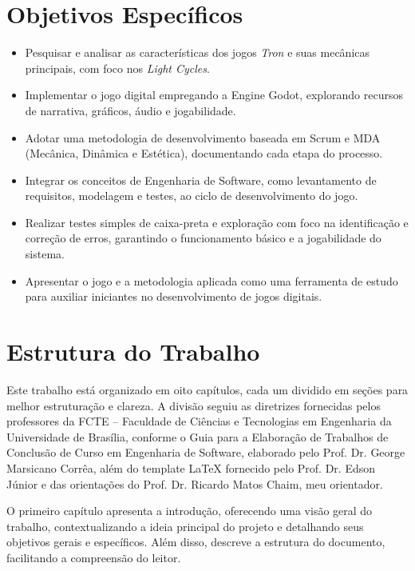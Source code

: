 \section*{Objetivos Específicos}

\begin{itemize}
  \item Pesquisar e analisar as características dos jogos \textit{Tron} e suas mecânicas principais, com foco nos \textit{Light Cycles}.
  \item Implementar o jogo digital empregando a Engine Godot, explorando recursos de narrativa, gráficos, áudio e jogabilidade.
  \item Adotar uma metodologia de desenvolvimento baseada em Scrum e MDA (Mecânica, Dinâmica e Estética), documentando cada etapa do processo.
  \item Integrar os conceitos de Engenharia de Software, como levantamento de requisitos, modelagem e testes, ao ciclo de desenvolvimento do jogo.
  \item Realizar testes simples de caixa-preta e exploração com foco na identificação e correção de erros, garantindo o funcionamento básico e a jogabilidade do sistema.
  \item Apresentar o jogo e a metodologia aplicada como uma ferramenta de estudo para auxiliar iniciantes no desenvolvimento de jogos digitais.
\end{itemize}

\section*{Estrutura do Trabalho}

Este trabalho está organizado em oito capítulos, cada um dividido em seções para melhor estruturação e clareza. A divisão seguiu as diretrizes fornecidas pelos professores da FCTE – Faculdade de Ciências e Tecnologias em Engenharia da Universidade de Brasília, conforme o Guia para a Elaboração de Trabalhos de Conclusão de Curso em Engenharia de Software, elaborado pelo Prof. Dr. George Marsicano Corrêa, além do template LaTeX fornecido pelo Prof. Dr. Edson Júnior e das orientações do Prof. Dr. Ricardo Matos Chaim, meu orientador.

O primeiro capítulo apresenta a introdução, oferecendo uma visão geral do trabalho, contextualizando a ideia principal do projeto e detalhando seus objetivos gerais e específicos. Além disso, descreve a estrutura do documento, facilitando a compreensão do leitor.

